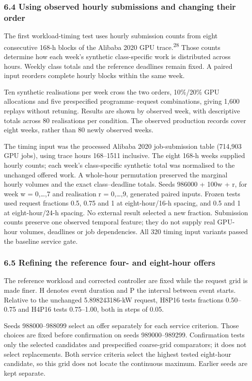 \documentclass[10pt,a4paper]{article}
\begin{document}
\subsubsection{6.4 Using observed hourly submissions and changing their order}

The first workload-timing test uses hourly submission counts from eight consecutive 168-h blocks of the Alibaba 2020 GPU trace.\textsuperscript{28} Those counts determine how each week's synthetic class-specific work is distributed across hours. Weekly class totals and the reference deadlines remain fixed. A paired input reorders complete hourly blocks within the same week.


Ten synthetic realisations per week cross the two orders, 10\%/20\% GPU allocations and five prespecified programme–request combinations, giving 1,600 replays without retuning. Results are shown by observed week, with descriptive totals across 80 realisations per condition. The observed production records cover eight weeks, rather than 80 newly observed weeks.


The timing input was the processed Alibaba 2020 job-submission table (714,903 GPU jobs), using trace hours 168–1511 inclusive. The eight 168-h weeks supplied hourly counts; each week’s class-specific synthetic total was normalised to the unchanged offered work. A whole-hour permutation preserved the marginal hourly volumes and the exact class–deadline totals. Seeds 986000 + 100w + r, for week w = 0,…,7 and realisation r = 0,…,9, generated paired inputs. Frozen tests used request fractions 0.5, 0.75 and 1 at eight-hour/16-h spacing, and 0.5 and 1 at eight-hour/24-h spacing. No external result selected a new fraction. Submission counts preserve one observed temporal feature; they do not supply real GPU-hour volumes, deadlines or job dependencies. All 320 timing input variants passed the baseline service gate.


\subsubsection{6.5 Refining the reference four- and eight-hour offers}

The reference workload and corrected controller are fixed while the request grid is made finer. H denotes event duration and P the interval between event starts. Relative to the unchanged 5.898243186-kW request, H8P16 tests fractions 0.50–0.75 and H4P16 tests 0.75–1.00, both in steps of 0.05.


Seeds 988000–988099 select an offer separately for each service criterion. Those choices are fixed before confirmation on seeds 989000–989299. Confirmation tests only the selected candidates and prespecified coarse-grid comparators; it does not select replacements. Both service criteria select the highest tested eight-hour candidate, so this grid does not locate the continuous maximum. Earlier seeds are kept separate.
\end{document}

